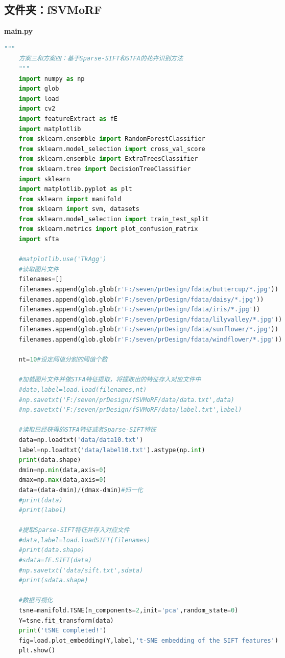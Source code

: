 \documentclass[supercite]{HustGraduPaper}
\begin{document}
\begin{sloppypar}
\begin{appendices}
\subsection{文件夹：fSVMoRF}
\textbf{main.py}
  \begin{spacing}{1.25}
  \begin{lstlisting}[language=python]
    """
    方案三和方案四：基于Sparse-SIFT和STFA的花卉识别方法
    """
    import numpy as np
    import glob
    import load
    import cv2
    import featureExtract as fE
    import matplotlib
    from sklearn.ensemble import RandomForestClassifier
    from sklearn.model_selection import cross_val_score
    from sklearn.ensemble import ExtraTreesClassifier
    from sklearn.tree import DecisionTreeClassifier
    import sklearn
    import matplotlib.pyplot as plt
    from sklearn import manifold
    from sklearn import svm, datasets
    from sklearn.model_selection import train_test_split
    from sklearn.metrics import plot_confusion_matrix
    import sfta
    
    #matplotlib.use('TkAgg')
    #读取图片文件
    filenames=[]
    filenames.append(glob.glob(r'F:/seven/prDesign/fdata/buttercup/*.jpg'))
    filenames.append(glob.glob(r'F:/seven/prDesign/fdata/daisy/*.jpg'))
    filenames.append(glob.glob(r'F:/seven/prDesign/fdata/iris/*.jpg'))
    filenames.append(glob.glob(r'F:/seven/prDesign/fdata/lilyvalley/*.jpg'))
    filenames.append(glob.glob(r'F:/seven/prDesign/fdata/sunflower/*.jpg'))
    filenames.append(glob.glob(r'F:/seven/prDesign/fdata/windflower/*.jpg'))
    
    nt=10#设定阈值分割的阈值个数
    
    #加载图片文件并做STFA特征提取，将提取出的特征存入对应文件中
    #data,label=load.load(filenames,nt)
    #np.savetxt('F:/seven/prDesign/fSVMoRF/data/data.txt',data)
    #np.savetxt('F:/seven/prDesign/fSVMoRF/data/label.txt',label)
    
    #读取已经获得的STFA特征或者Sparse-SIFT特征
    data=np.loadtxt('data/data10.txt')
    label=np.loadtxt('data/label10.txt').astype(np.int)
    print(data.shape)
    dmin=np.min(data,axis=0)
    dmax=np.max(data,axis=0)
    data=(data-dmin)/(dmax-dmin)#归一化
    #print(data)
    #print(label)
    
    #提取Sparse-SIFT特征并存入对应文件
    #data,label=load.loadSIFT(filenames)
    #print(data.shape)
    #sdata=fE.SIFT(data)
    #np.savetxt('data/sift.txt',sdata)
    #print(sdata.shape)
    
    #数据可视化
    tsne=manifold.TSNE(n_components=2,init='pca',random_state=0)
    Y=tsne.fit_transform(data)
    print('tSNE completed!')
    fig=load.plot_embedding(Y,label,'t-SNE embedding of the SIFT features')
    plt.show()
    

\end{lstlisting}
\end{spacing}
\end{appendices}
\end{sloppypar}
\end{document}
